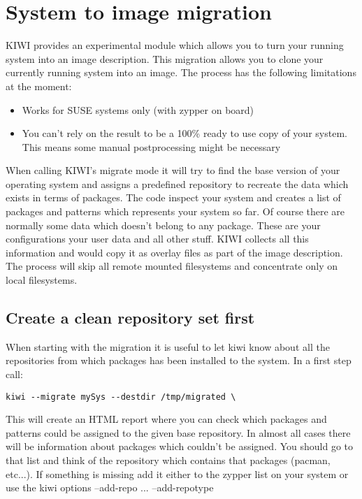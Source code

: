 \chapter{System to image migration}
\label{chapter:migration}
\minitoc

KIWI provides an experimental module which allows you to turn your
running system into an image description. This migration allows you
to clone your currently running system into an image. The process
has the following limitations at the moment:

\begin{itemize}
\item Works for SUSE systems only (with zypper on board)
\item You can't rely on the result to be a 100\% ready to use copy
      of your system. This means some manual postprocessing might
      be necessary
\end{itemize}

When calling KIWI's migrate mode it will try to find the base version
of your operating system and assigns a predefined repository to recreate
the data which exists in terms of packages. The code inspect your
system and creates a list of packages and patterns which represents
your system so far. Of course there are normally some data which
doesn't belong to any package. These are your configurations your user
data and all other stuff. KIWI collects all this information and would
copy it as overlay files as part of the image description. The process
will skip all remote mounted filesystems and concentrate only on local
filesystems.

\section{Create a clean repository set first}
When starting with the migration it is useful to let kiwi know about all
the repositories from which packages has been installed to 
the system. In a first step call:

\begin{Command}{12cm}
\begin{verbatim}
kiwi --migrate mySys --destdir /tmp/migrated \
\end{verbatim}
\end{Command}

This will create an HTML report where you can check which packages and
patterns could be assigned to the given base repository. In almost
all cases there will be information about packages which couldn't
be assigned. You should go to that list and think of the repository
which contains that packages (pacman, etc...). If something is missing
add it either to the zypper list on your system or use the kiwi
options --add-repo ... --add-repotype

